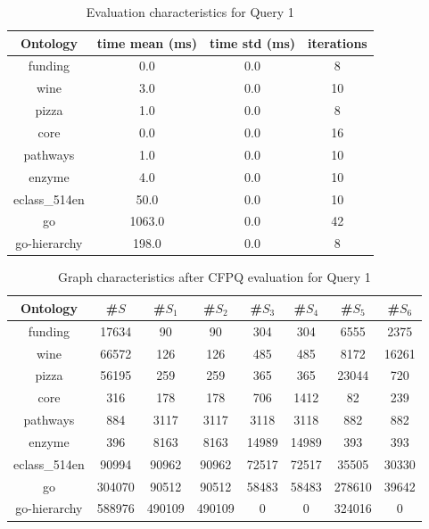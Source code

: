 \begin{table*}[ht]
	\centering
	\caption{Evaluation characteristics for Query 1}
	\label{tbl2}
	
	\begin{tabular}{ | c | c | c | c |}
		\hline
		Ontology & time mean (ms) & time std (ms) & iterations \\
		\hline 
		\hline
		funding        & 0.0 & 0.0 & 8\\
		wine           & 3.0 & 0.0 & 10\\
		pizza          & 1.0 & 0.0 & 8\\
		core           & 0.0 & 0.0 & 16\\
		pathways       & 1.0 & 0.0 & 10\\
		enzyme         & 4.0 & 0.0 & 10\\
		eclass\_514en  & 50.0 & 0.0 & 10\\
		go             & 1063.0 & 0.0 & 42\\
		go-hierarchy   & 198.0 & 0.0 & 8\\
		\hline
	\end{tabular}
	
\end{table*}

\begin{table*}[ht]
	\centering
	\caption{Graph characteristics after CFPQ evaluation for Query 1}
	\label{tbl3}
	
	\begin{tabular}{ | c | c | c | c | c | c | c | c |}
		\hline
		Ontology & \#$S$ & \#$S_1$ & \#$S_2$ & \#$S_3$ & \#$S_4$ & \#$S_5$ & \#$S_6$\\
		\hline 
		\hline
		funding        & 17634 & 90 & 90 & 304 & 304 & 6555 & 2375\\
		wine           & 66572 & 126 & 126 & 485 & 485 & 8172 & 16261\\
		pizza          & 56195 & 259 & 259 & 365 & 365 & 23044 & 720\\
		core           & 316 & 178 & 178 & 706 & 1412 & 82 & 239\\
		pathways       & 884 & 3117 & 3117 & 3118 & 3118 & 882 & 882\\
		enzyme         & 396 & 8163 & 8163 & 14989 & 14989 & 393 & 393\\
		eclass\_514en  & 90994 & 90962 & 90962 & 72517 & 72517 & 35505 & 30330\\
		go             & 304070 & 90512 & 90512 & 58483 & 58483 & 278610 & 39642\\
		go-hierarchy   & 588976 & 490109 & 490109 & 0 & 0 & 324016 & 0\\
		\hline
	\end{tabular}
	
\end{table*}

